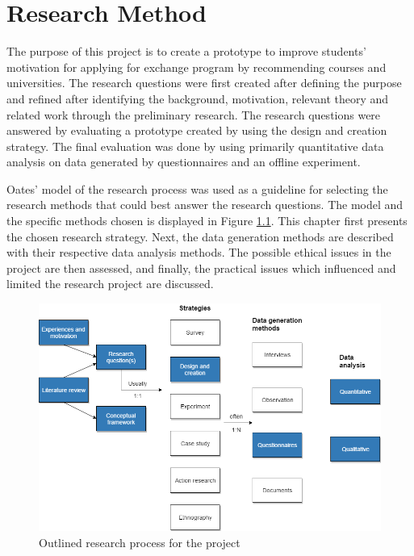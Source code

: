 
\chapter{Research Method}\label{chap:4}

The purpose of this project is to create a prototype to improve students' motivation for applying for exchange program by recommending courses and universities. The research questions were first created after defining the purpose and refined after identifying the background, motivation, relevant theory and related work through the preliminary research. The research questions were answered by evaluating a prototype created by using the design and creation strategy. The final evaluation was done by using primarily quantitative data analysis on data generated by questionnaires and an offline experiment.

Oates'\cite{oates2005researching} model of the research process was used as a guideline for selecting the research methods that could best answer the research questions. The model and the specific methods chosen is displayed in Figure \ref{fig:research_process}. This chapter first presents the chosen research strategy. Next, the data generation methods are described with their respective data analysis methods. The possible ethical issues in the project are then assessed, and finally, the practical issues which influenced and limited the research project are discussed. 

\begin{figure}[H]
    \centering
    \includegraphics[width=1\textwidth]{fig/research_process.png}
    \caption[Research process]{Outlined research process for the project}
    \label{fig:research_process}
\end{figure}

